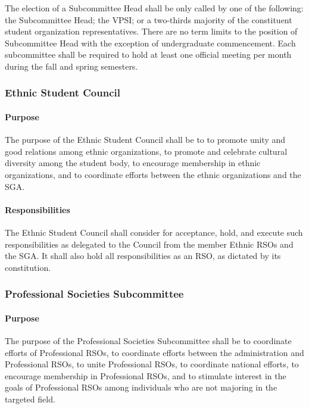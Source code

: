 \documentclass[12pt]{scrreprt}
\begin{document}
The election of a Subcommittee Head shall be only called by one of the following: the
Subcommittee Head; the VPSI; or a two-thirds majority of the constituent student organization
representatives. There are no term limits to the position of Subcommittee Head with the
exception of undergraduate commencement.
Each subcommittee shall be required to hold at least one official meeting per month during
the fall and spring semesters.

\subsubsection{Ethnic Student Council}

\paragraph{Purpose}
The purpose of the Ethnic Student Council shall be to to promote unity and good relations among ethnic organizations, to promote and celebrate cultural diversity
among the student body, to encourage membership in ethnic organizations, and to coordinate efforts between the ethnic organizations and the SGA.

\paragraph{Responsibilities}
The Ethnic Student Council shall consider for acceptance, hold, and
execute such responsibilities as delegated to the Council from the member Ethnic RSOs
and the SGA. It shall also hold all responsibilities as an RSO, as dictated by its constitution.

\subsubsection{Professional Societies Subcommittee}

\paragraph{Purpose}
​The purpose of the Professional Societies Subcommittee shall be to coordinate
efforts of Professional RSOs, to coordinate efforts between the administration and
Professional RSOs, to unite Professional RSOs, to coordinate national efforts, to encourage
membership in Professional RSOs, and to stimulate interest in the goals of Professional
RSOs among individuals who are not majoring in the targeted field.
\end{document}
